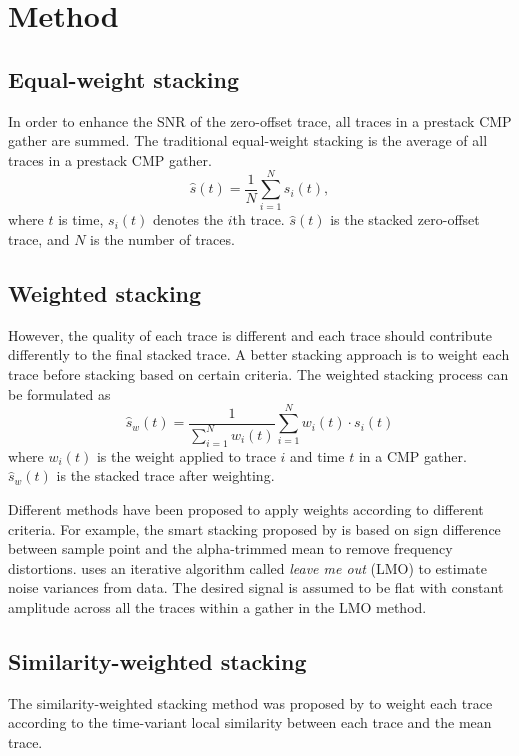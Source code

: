 \section{Method}
\subsection{Equal-weight stacking}
In order to enhance the SNR of the zero-offset trace, all traces in a prestack CMP gather are summed. The traditional equal-weight stacking is the average of all traces in a prestack CMP gather.
\begin{equation}
\label{eq:stack}
\hat{s}(t)= \frac{1}{N}\sum_{i=1}^{N} s_i(t),
\end{equation} 
where $t$ is time, $s_i(t)$ denotes the $i$th trace. $\hat{s}(t)$ is the stacked zero-offset trace, and $N$ is the number of traces. 

\subsection{Weighted stacking}
However, the quality of each trace is different and each trace should contribute differently to the final stacked trace. A better stacking approach is to weight each trace before stacking based on certain criteria. The weighted stacking process can be formulated as
\begin{equation}
\label{eq:simistack}
\hat{s}_w(t)= \frac{1}{\sum_{i=1}^{N}w_{i}(t)}\sum_{i=1}^{N}w_{i}(t)\cdot s_i(t) 
\end{equation} 
where $w_{i}(t)$ is the weight applied to trace $i$ and time $t$ in a CMP gather. $\hat{s}_w(t)$ is the stacked trace after weighting.

Different methods have been proposed to apply weights according to different criteria. For example, the smart stacking proposed by \cite{Rashed08} is based on sign difference between sample point and the alpha-trimmed mean to remove frequency distortions. \cite{Neelamani06} uses an iterative algorithm called \emph{leave me out} (LMO) to estimate noise variances from data. The desired signal is assumed to be flat with constant amplitude across all the traces within a gather in the LMO method.

\subsection{Similarity-weighted stacking}
The similarity-weighted stacking method was proposed by \cite{Liu09} to weight each trace according to the time-variant local similarity between each trace and the mean trace.

